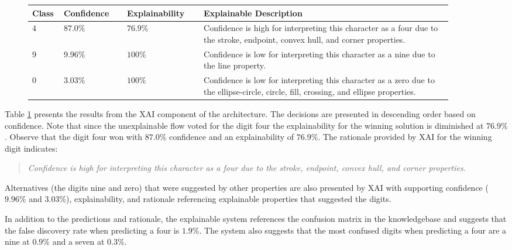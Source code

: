 \begin{figure}[H]
    \renewcommand{\arraystretch}{1.3}
     \label{table:mnist_example1_explanation}
    \begin{tabular}{| m{0.06\linewidth} | m{0.14\linewidth} | m{0.17\linewidth} | m{0.55\linewidth} |}
    \hline
     Class & Confidence & Explainability & Explainable Description \\
    \hline \hline
    $4$ & $87.0\%$ & $76.9\%$ & Confidence is high for interpreting this character as a four due to the stroke, endpoint, convex hull, and corner properties. \\ 
    \hline
    $9$ & $9.96\%$ & $100\%$ & Confidence is low for interpreting this character as a nine due to the line property. \\
    \hline
    $0$ & $3.03\%$ & $100\%$ & Confidence is low for interpreting this character as a zero due to the ellipse-circle, circle, fill, crossing, and ellipse properties. \\
    \hline
    \end{tabular}
\end{figure}

Table \ref{table:mnist_example1_explanation} presents the results from the XAI
component of the architecture. The decisions are presented in descending order
based on confidence.  Note that since the unexplainable flow voted for the digit
four the explainability for the winning solution is diminished at $76.9\%$.
Observe that the digit four won with $87.0\%$ confidence and an explainability
of $76.9\%$.  The rationale provided by XAI for the winning digit indicates:

\begin{quote}
    \textit{Confidence is high for interpreting this character as a four due to the stroke, endpoint, convex hull, and corner properties.}
\end{quote}

Alternatives (the digits nine and zero) that were suggested by other properties
are also presented by XAI with supporting confidence ($9.96\%$ and $3.03\%$),
explainability, and rationale referencing explainable properties that suggested
the digits.

In addition to the predictions and rationale, the explainable system references
the confusion matrix in the knowledgebase and suggests that the false discovery
rate when predicting a four is $1.9\%$.  The system also suggests that the most
confused digits when predicting a four are a nine at $0.9\%$ and a seven at
$0.3\%$.


